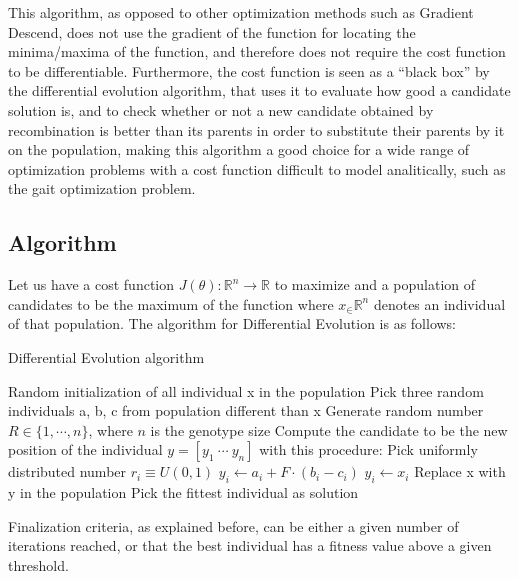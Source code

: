 This algorithm, as opposed to other optimization methods such as Gradient Descend, does not use the gradient of the function for locating the minima/maxima of the function, and therefore does not require the cost function to be differentiable. Furthermore, the cost function is seen as a ``black box'' by the differential evolution algorithm, that uses it to evaluate how good a candidate solution is, and to check whether or not a new candidate obtained by recombination is better than its parents in order to substitute their parents by it on the population, making this algorithm a good choice for a wide range of optimization problems with a cost function difficult to model analitically, such as the gait optimization problem.\\

\subsection{Algorithm}
\label{evolution_algorithm}

Let us have a cost function $J(\theta): \mathbb{R}^n \rightarrow \mathbb{R}$ to maximize and a population of candidates to be the maximum of the function where $x_ \in \mathbb{R}^n$ denotes an individual of that population. The algorithm for Differential Evolution is as follows:\\

\begin{algorithm}
\caption{Differential Evolution algorithm}\label{DE_algorithm}
\begin{algorithmic}[1]
\State Random initialization of all individual x in the population
	\State Pick three random individuals a, b, c from population different than x
	\State Generate random number $ R \in \{1, \cdots, n\}$, where $n$ is the genotype size
	\State Compute the candidate to be the new position of the individual $y = [ y_1 ~ \cdots ~ y_n ]$ with this procedure:
		\State Pick uniformly distributed number $r_i \equiv U(0, 1)$
		\State $y_i \gets a_i + F \cdot (b_i-c_i)$
		\Else
		\State $y_i \gets x_i$ 
		\EndIf
	\EndFor
		\State Replace x with y in the population
	\EndIf
\EndFor
\EndWhile
\State Pick the fittest individual as solution
\end{algorithmic}
\end{algorithm}

Finalization criteria, as explained before, can be either a given number of iterations reached, or that the best individual has a fitness value above a given threshold.\\

